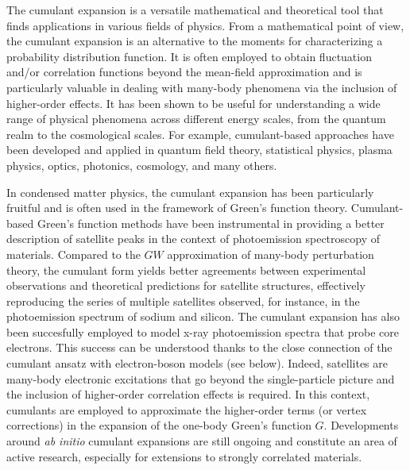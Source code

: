 \documentclass[aip,jcp,reprint,noshowkeys,superscriptaddress]{revtex4-2}
\begin{document}
The cumulant expansion is a versatile mathematical and theoretical tool that finds applications in various fields of physics. \cite{Kubo_1962} 
From a mathematical point of view, the cumulant expansion is an alternative to the moments for characterizing a probability distribution function.
It is often employed to obtain fluctuation and/or correlation functions beyond the mean-field approximation and is particularly valuable in dealing with many-body phenomena via the inclusion of higher-order effects.
It has been shown to be useful for understanding a wide range of physical phenomena across different energy scales, from the quantum realm to the cosmological scales. 
For example, cumulant-based approaches have been developed and applied in quantum field theory, \cite{Fauser_1996} statistical physics, \cite{Evans_1976} plasma physics, \cite{Cherif_2016} optics, \cite{Schack_1990} photonics, \cite{Sanchez-Barquilla_2020} cosmology, \cite{Garny_2023} and many others.

In condensed matter physics, the cumulant expansion has been particularly fruitful and is often used in the framework of Green's function theory. \cite{Hedin_1999,Onida_2002,MartinBook} Cumulant-based Green's function methods have been instrumental in providing a better description of satellite peaks in the context of photoemission spectroscopy of materials. \cite{Aryasetiawan_1996,Aryasetiawan_1998,Vos_1999,Vos_2001,Vos_2002,Kheifets_2003,Guzzo_2011,Lischner_2013,Gatt_2013,Guzzo_2014,Kas_2014,Caruso_2015b,Zhou_2015,Lischner_2015,Nakamur_2016,Gumhalter_2016,Kas_2016,Verdi_2017,Zhou_2018} 
Compared to the $GW$ approximation of many-body perturbation theory, \cite{Hedin_1965,Aryasetiawan_1998,Reining_2017,Golze_2019,Marie_2023b} the cumulant form yields better agreements between experimental observations and theoretical predictions for satellite structures, effectively reproducing the series of multiple satellites observed, for instance, in the photoemission spectrum of sodium \cite{Aryasetiawan_1996,Zhou_2015,Zhou_2018} and silicon. \cite{Kheifets_2003,Guzzo_2011,Lischner_2015,Caruso_2015a,Caruso_2015b,Gumhalter_2016,Vlcek_2018}
The cumulant expansion has also been succesfully employed to model x-ray photoemission spectra that probe core electrons. \cite{Nozieres_1969,Becrstedt_1980,Bechstedt_1980,Bechstedt_1982,Kas_2022a} This success can be understood thanks to the close connection of the cumulant ansatz with electron-boson models (see below). \cite{Lundqvist_1969,Langreth_1970,Gunnarsson_1994,Hedin_1980,Hedin_1999}
Indeed, satellites are many-body electronic excitations that go beyond the single-particle picture and the inclusion of higher-order correlation effects is required. \cite{Cederbaum_1974,Mejuto-Zaera_2021} 
In this context, cumulants are employed to approximate the higher-order terms (or vertex corrections) in the expansion of the one-body Green's function $G$.
Developments around \textit{ab initio} cumulant expansions are still ongoing and constitute an area of active research, \cite{Tzavala_2020,Cudazzo_2020a,Cudazzo_2020b,Kas_2022} especially for extensions to strongly correlated materials. \cite{Biermann_2016}
\end{document}
